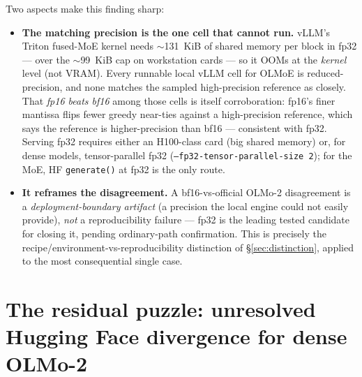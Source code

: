 \documentclass[11pt]{report}
\newcommand{\code}[1]{\texttt{#1}}
\begin{document}
\par\medskip
Two aspects make this finding sharp:

\begin{itemize}[nosep]
  \item \textbf{The matching precision is the one cell that cannot run.} vLLM's
        Triton fused-MoE kernel needs $\sim$131~KiB of shared memory per block in
        fp32 --- over the $\sim$99~KiB cap on workstation cards --- so it OOMs at
        the \emph{kernel} level (not VRAM). Every runnable local vLLM cell for
        OLMoE is reduced-precision, and none matches the sampled high-precision reference as closely. That
        \emph{fp16 beats bf16} among those cells is itself corroboration: fp16's
        finer mantissa flips fewer greedy near-ties against a high-precision
        reference, which says the reference is higher-precision than bf16 ---
        consistent with fp32. Serving fp32 requires either an H100-class card (big
        shared memory) or, for dense models, tensor-parallel fp32
        (\code{--fp32-tensor-parallel-size 2}); for the MoE, HF \code{generate()}
        at fp32 is the only route.
  \item \textbf{It reframes the disagreement.} A bf16-vs-official OLMo-2
        disagreement is a \emph{deployment-boundary artifact} (a precision the
        local engine could not easily provide), \emph{not} a reproducibility
        failure --- fp32 is the leading tested candidate for closing it, pending ordinary-path confirmation. This is precisely the
        recipe/environment-vs-reproducibility distinction of \S\ref{sec:distinction},
        applied to the most consequential single case.
\end{itemize}

\section{The residual puzzle: unresolved Hugging Face divergence for dense OLMo-2}
\end{document}
